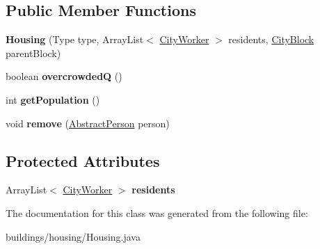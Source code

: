 \subsection*{Public Member Functions}
\begin{DoxyCompactItemize}
\item 
{\bfseries Housing} (Type type, Array\+List$<$ \hyperlink{classpeople_1_1cityworkers_1_1_city_worker}{City\+Worker} $>$ residents, \hyperlink{classcities_1_1_city_block}{City\+Block} parent\+Block)\hypertarget{classbuildings_1_1housing_1_1_housing_abaa0b7d5243c38b51c4165b12c7cac93}{}\label{classbuildings_1_1housing_1_1_housing_abaa0b7d5243c38b51c4165b12c7cac93}

\item 
boolean {\bfseries overcrowdedQ} ()\hypertarget{classbuildings_1_1housing_1_1_housing_a61f6b7edcb14322deef9cc70339387ed}{}\label{classbuildings_1_1housing_1_1_housing_a61f6b7edcb14322deef9cc70339387ed}

\item 
int {\bfseries get\+Population} ()\hypertarget{classbuildings_1_1housing_1_1_housing_a1d83721b98653416ba227fb29fa9cf6f}{}\label{classbuildings_1_1housing_1_1_housing_a1d83721b98653416ba227fb29fa9cf6f}

\item 
void {\bfseries remove} (\hyperlink{classpeople_1_1_abstract_person}{Abstract\+Person} person)\hypertarget{classbuildings_1_1housing_1_1_housing_ae09d37a9015f77da8a8f6102789ea7f4}{}\label{classbuildings_1_1housing_1_1_housing_ae09d37a9015f77da8a8f6102789ea7f4}

\end{DoxyCompactItemize}
\subsection*{Protected Attributes}
\begin{DoxyCompactItemize}
\item 
Array\+List$<$ \hyperlink{classpeople_1_1cityworkers_1_1_city_worker}{City\+Worker} $>$ {\bfseries residents}\hypertarget{classbuildings_1_1housing_1_1_housing_a09c803473c6e388136c736ce604f386c}{}\label{classbuildings_1_1housing_1_1_housing_a09c803473c6e388136c736ce604f386c}

\end{DoxyCompactItemize}


The documentation for this class was generated from the following file\+:\begin{DoxyCompactItemize}
\item 
buildings/housing/Housing.\+java\end{DoxyCompactItemize}
